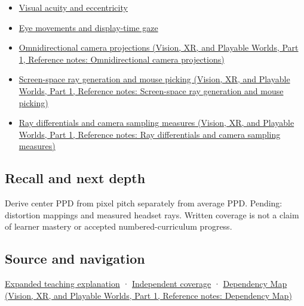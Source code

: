 \begin{itemize}
\item
  \hyperref[appendix-b491fc48c54b]{Visual acuity and eccentricity}
\item
  \hyperref[appendix-a6f2c4fe1996]{Eye movements and display-time gaze}
\item
  \href{../07-Vision-XR-and-Playable-Worlds-P01/main.pdf\#nameddest=appendix-fc99ad39f351}{Omnidirectional camera projections (Vision, XR, and Playable Worlds, Part 1, Reference notes: Omnidirectional camera projections)}
\item
  \href{../07-Vision-XR-and-Playable-Worlds-P01/main.pdf\#nameddest=appendix-f1a6d43e80d1}{Screen-space ray generation and mouse picking (Vision, XR, and Playable Worlds, Part 1, Reference notes: Screen-space ray generation and mouse picking)}
\item
  \href{../07-Vision-XR-and-Playable-Worlds-P01/main.pdf\#nameddest=appendix-8c40fad29462}{Ray differentials and camera sampling measures (Vision, XR, and Playable Worlds, Part 1, Reference notes: Ray differentials and camera sampling measures)}
\end{itemize}

\subsection{Recall and next depth}\label{appendix-7d356c396d1a-recall-and-next-depth}

\hypertarget{appendix-7d356c396d1a-recall-and-next-depth}{}

Derive center PPD from pixel pitch separately from average PPD. Pending: distortion mappings and measured headset rays. Written coverage is not a claim of learner mastery or accepted numbered-curriculum progress.

\subsection{Source and navigation}\label{appendix-7d356c396d1a-source-and-navigation}

\hypertarget{appendix-7d356c396d1a-source-and-navigation}{}

\hyperref[04-visual-computing-ii-ch042-angles-connect-display-samples-to-a-viewer]{Expanded teaching explanation} · \hyperref[appendix-fd090d982a15-xr01---independent-seeing-and-representation-source]{Independent coverage} · \href{../07-Vision-XR-and-Playable-Worlds-P01/main.pdf\#nameddest=appendix-4ad47bdd269a}{Dependency Map (Vision, XR, and Playable Worlds, Part 1, Reference notes: Dependency Map)}

